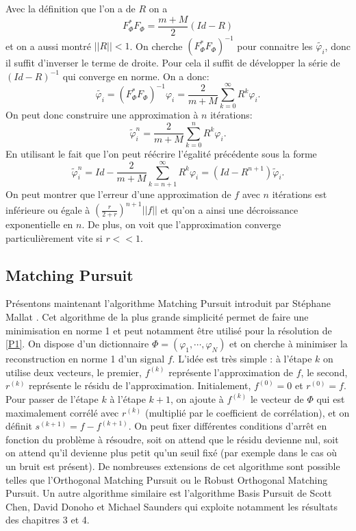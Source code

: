 Avec la définition que l'on a de $R$ on a 
\begin{equation}
	F_\Phi^*F_\Phi = \frac{m+M}{2} (Id - R)
\end{equation}
et on a aussi montré $||R||< 1$.
On cherche $(F_\Phi^*F_\Phi)^{-1}$ pour connaitre les $\tilde{\varphi_i}$, donc il suffit d'inverser le terme de droite.
Pour cela il suffit de développer la série de $(Id-R)^{-1}$ qui converge en norme.
On a donc:
\begin{equation}
	\tilde{\varphi_i} = (F_\Phi^*F_\Phi)^{-1} \varphi_i = \frac{2}{m+M} \sum_{k=0}^\infty R^k \varphi_i. 
\end{equation}
On peut donc construire une approximation à $n$ itérations:
\begin{equation}
	\tilde{\varphi}_i^n = \frac{2}{m+M} \sum_{k=0}^n R^k \varphi_i. 
\end{equation}
En utilisant le fait que l'on peut réécrire l'égalité précédente sous la forme
\begin{equation}	
	\tilde{\varphi}_i^n = Id - \frac{2}{m+M} \sum_{k=n+1}^\infty R^k \varphi_i = (Id -R^{n+1})\tilde{\varphi}_i. 
\end{equation}
On peut montrer que l'erreur d'une approximation de $f$ avec $n$ itérations est inférieure ou égale à $(\frac{r}{2+r})^{n+1}||f||$ et qu'on a ainsi une décroissance exponentielle en $n$.
De plus, on voit que l'approximation converge particulièrement vite si $r<<1$.
\subsection{Matching Pursuit}\label{MP}
Présentons maintenant l'algorithme Matching Pursuit introduit par Stéphane Mallat \cite{mpmallat}.
Cet algorithme de la plus grande simplicité permet de faire une minimisation en norme 1 et peut notamment être utilisé pour la résolution de \ref{P1}. 
\newline
On dispose d'un dictionnaire $\Phi =(\varphi_1, \cdots, \varphi_N)$ et on cherche à minimiser la reconstruction en norme 1 d'un signal $f$. 
L'idée est très simple : à l'étape $k$ on utilise deux vecteurs, le premier, $f^{(k)}$ représente l'approximation de $f$, le second, $r^{(k)}$ représente le résidu de l'approximation.
\newline
Initialement, $f^{(0)} = 0$ et $r^{(0)} = f$.
\newline
Pour passer de l'étape $k$ à l'étape $k+1$, on ajoute à $f^{(k)}$ le vecteur de $\Phi$ qui est maximalement corrélé avec $r^{(k)}$ (multiplié par le coefficient de corrélation), et on définit $s^{(k+1)} = f - f^{(k+1)}$.
\newline
On peut fixer différentes conditions d'arrêt en fonction du problème à résoudre, soit on attend que le résidu devienne nul, soit on attend qu'il devienne plus petit qu'un seuil fixé (par exemple dans le cas où un bruit est présent).
De nombreuses extensions de cet algorithme sont possible telles que l'Orthogonal Matching Pursuit ou le Robust Orthogonal Matching Pursuit. Un autre algorithme similaire est l'algorithme Basis Pursuit de Scott Chen, David Donoho et Michael Saunders \cite{basispursuit} qui exploite notamment les résultats des chapitres 3 et 4.

